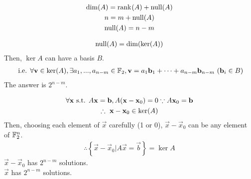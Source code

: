 \documentclass{mathtoolkit}
\begin{document}
\maketitle

\begin{p}
  \item
    \begin{subp}
      \item
        \begin{gather*}
          \dim{A} = \rank{A} + \mnull{A} \\
          n = m + \mnull{A} \\
          \mnull{A} = n - m
        \end{gather*}
      \item
        \begin{gather*}
          \mathrm{null}(A) = \mathrm{dim}(\mathrm{ker}(A))
        \end{gather*}
        Then, $\ker{A}$ can have a basis $B$.
        \begin{gather*}
          \text{i.e.} \forall \vec{v} \in \ker{A},
          \exists a_1, ..., a_{n-m} \in \field{F}_2,
          \vec{v} = a_1 \vec{b}_1 + \dots + a_{n-m} \vec{b}_{n-m}\ (\vec{b}_i \in B)
        \end{gather*}
        \therefore The answer is $2^{n-m}$.
      \item
        \begin{gather*}
          \forall \vec{x} \st A \vec{x} = \vec{b},
          A (\vec{x} - \vec{x}_0) = 0 \because A \vec{x}_0 = \vec{b} \\
          \therefore \vec{x} - \vec{x}_0 \in \ker{A}
        \end{gather*}
        Then, choosing each element of $\vec{x}$ carefully (1 or 0),
        $\vec{x} - \vec{x}_0$ can be any element of $\mathbb{F}^n_2$.
        \begin{gather*}
          \therefore \left\{ \vec{x} - \vec{x}_0 | A \vec{x} = \vec{b} \right\} = \ker{A}
        \end{gather*}
        \therefore $\vec{x} - \vec{x}_0$ has $2^{n-m}$ solutions. \\
        \therefore $\vec{x}$ has $2^{n-m}$ solutions. \\
    \end{subp}


\end{p}
\end{document}
